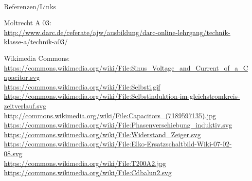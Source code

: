 \renewcommand{\refname}{Referenzen}

\hypertarget{refs}{}
\textcolor{white}{} \\ %
\Large Referenzen/Links
\footnotesize

\begin{thebibliography}{}
     Moltrecht A 03: \\
                    \url{http://www.darc.de/referate/ajw/ausbildung/darc-online-lehrgang/technik-klasse-a/technik-a03/}

        Wikimedia Commons: \\
                    \url{https://commons.wikimedia.org/wiki/File:Sinus_Voltage_and_Current_of_a_Capacitor.svg}\\
                    \url{https://commons.wikimedia.org/wiki/File:Selbsti.gif}\\
                    \url{https://commons.wikimedia.org/wiki/File:Selbstinduktion-im-gleichstromkreis-zeitverlauf.svg}\\
                    \url{http://commons.wikimedia.org/wiki/File:Capacitors_(7189597135).jpg}\\
                    \url{https://commons.wikimedia.org/wiki/File:Phasenverschiebung_induktiv.svg}\\
                    \url{https://commons.wikimedia.org/wiki/File:Widerstand_Zeiger.svg}\\
                    \url{https://commons.wikimedia.org/wiki/File:Elko-Ersatzschaltbild-Wiki-07-02-08.svg}\\
                    \url{https://commons.wikimedia.org/wiki/File:T200A2.jpg}\\
                    \url{https://commons.wikimedia.org/wiki/File:Cdbalun2.svg}\\
\end{thebibliography} 


